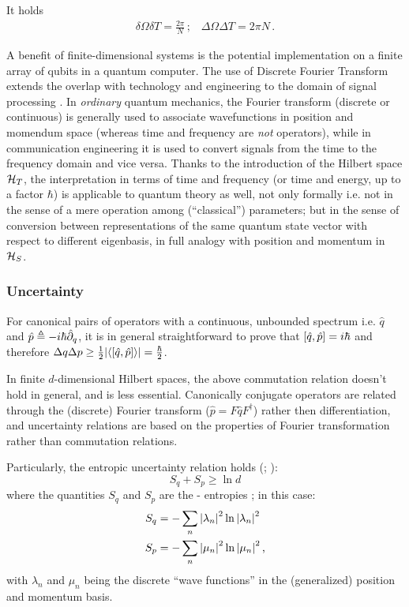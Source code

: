 It holds
\begin{gather}
  \delta\Omega \delta T = \frac{2\pi}{N} \, \text{;} \quad
  \Delta\Omega \Delta T = 2\pi N \, \text{.}
\end{gather}

A benefit of finite-dimensional systems is the potential implementation on a finite array of
qubits in a quantum computer. The use of Discrete Fourier Transform extends the overlap
with technology and engineering to the domain of signal processing \parencite{FiniteHilb}.
In \emph{ordinary} quantum mechanics, the Fourier transform (discrete or continuous)
is generally used
to associate wavefunctions in position and momendum space
(whereas time and frequency are \emph{not} operators),
while in communication engineering it is used to convert signals
from the time to the frequency domain and vice versa.
Thanks to the introduction of the Hilbert space $\mathcal{H}_T$,
the interpretation in terms of time and frequency
(or time and energy, up to a factor $\hbar$)
is applicable to quantum theory as well, not only formally
i.e. not in the sense of a mere operation among (``classical'') parameters;
but in the sense of conversion between representations of the
same quantum state vector with respect to different eigenbasis,
in full analogy with position and momentum in $\mathcal{H}_S$.

\subsubsection{Uncertainty}\label{sec:finite_uncertainty}
\citereset
For canonical pairs of operators with a continuous, unbounded spectrum i.e.
$\hat{q}$ and $\hat{p} \triangleq -i\hbar\hat{\partial}_{q}$,
it is in general straightforward to prove that
$\qty[\hat{q}, \hat{p}] = i\hbar$ and therefore
$\Delta q \Delta p \geq {\frac{1}{2} \qty|\ev{\qty[\hat{q}, \hat{p}]}| = \frac{\hbar}{2}}$.

In finite $d$-dimensional Hilbert spaces, the above commutation relation doesn't hold
in general, and is less essential.
Canonically conjugate operators are related
through the (discrete) Fourier transform ($\hat{p} = F\hat{q}F^{\dagger}$)
rather then differentiation,
and uncertainty relations are based on
the properties of Fourier transformation
rather than commutation relations.

Particularly, the entropic uncertainty relation holds
(\cite[\S 2.4]{FiniteHilb}; \cite{Deutsch:Uncertainty}):
\begin{equation}
  S_q + S_p \geq \ln d
\end{equation}
where the quantities $S_q$ and $S_p$ are the - entropies
\parencite[\S {\it I}.A]{Wehner:Uncertainty}; in this case:
\begin{align}
  S_q &= -\sum_n \qty|\lambda_n |^2  \ln\qty|\lambda_n|^2 \\
  S_p &= -\sum_n \qty|\mu_n     |^2  \ln\qty|\mu_n    |^2
  \,\text{,}
\end{align}
with $\lambda_n$ and $\mu_n$ being the discrete ``wave functions'' in the
(generalized) position and momentum basis.

